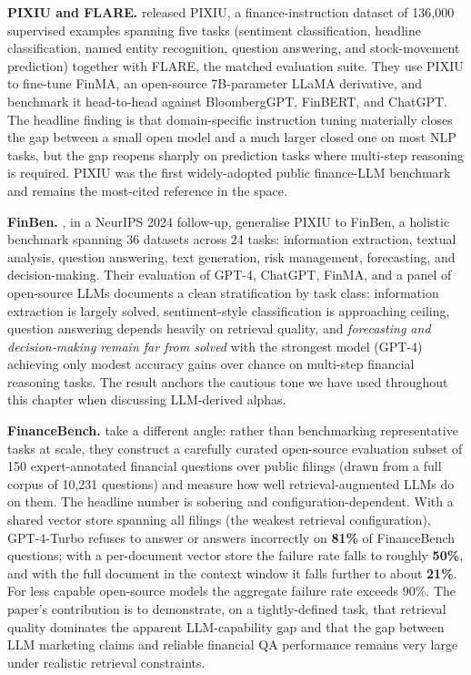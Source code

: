 \textbf{PIXIU and FLARE.} \cite{xie2023pixiu} released PIXIU, a finance-instruction dataset of 136,000 supervised examples spanning five tasks (sentiment classification, headline classification, named entity recognition, question answering, and stock-movement prediction) together with FLARE, the matched evaluation suite. They use PIXIU to fine-tune FinMA, an open-source 7B-parameter LLaMA derivative, and benchmark it head-to-head against BloombergGPT, FinBERT, and ChatGPT. The headline finding is that domain-specific instruction tuning materially closes the gap between a small open model and a much larger closed one on most NLP tasks, but the gap reopens sharply on prediction tasks where multi-step reasoning is required. PIXIU was the first widely-adopted public finance-LLM benchmark and remains the most-cited reference in the space.

\textbf{FinBen.} \cite{xie2024finben}, in a NeurIPS 2024 follow-up, generalise PIXIU to FinBen, a holistic benchmark spanning 36 datasets across 24 tasks: information extraction, textual analysis, question answering, text generation, risk management, forecasting, and decision-making. Their evaluation of GPT-4, ChatGPT, FinMA, and a panel of open-source LLMs documents a clean stratification by task class: information extraction is largely solved, sentiment-style classification is approaching ceiling, question answering depends heavily on retrieval quality, and \textit{forecasting and decision-making remain far from solved} with the strongest model (GPT-4) achieving only modest accuracy gains over chance on multi-step financial reasoning tasks. The result anchors the cautious tone we have used throughout this chapter when discussing LLM-derived alphas.

\textbf{FinanceBench.} \cite{islam2023financebench} take a different angle: rather than benchmarking representative tasks at scale, they construct a carefully curated open-source evaluation subset of 150 expert-annotated financial questions over public filings (drawn from a full corpus of 10,231 questions) and measure how well retrieval-augmented LLMs do on them. The headline number is sobering and configuration-dependent. With a shared vector store spanning all filings (the weakest retrieval configuration), GPT-4-Turbo refuses to answer or answers incorrectly on \textbf{81\%} of FinanceBench questions; with a per-document vector store the failure rate falls to roughly \textbf{50\%}, and with the full document in the context window it falls further to about \textbf{21\%}. For less capable open-source models the aggregate failure rate exceeds 90\%. The paper's contribution is to demonstrate, on a tightly-defined task, that retrieval quality dominates the apparent LLM-capability gap and that the gap between LLM marketing claims and reliable financial QA performance remains very large under realistic retrieval constraints.

